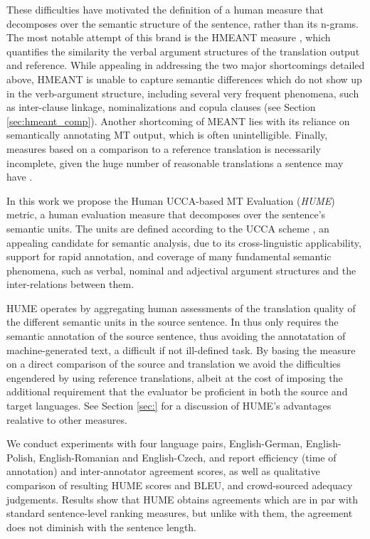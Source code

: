 \documentclass[11pt]{article}
\newcommand{\secref}[1]{Section \ref{#1}}
\begin{document}
These difficulties have motivated the definition of a human measure that decomposes over
the semantic structure of the sentence, rather than its n-grams. The most notable attempt of
this brand is the HMEANT
measure \cite{LoWu2010,lo2011structured,LoWu2011b,LoWu2012}, which quantifies the
similarity the verbal argument structures of the translation output and reference.
While appealing in addressing the two major shortcomings
detailed above, HMEANT is unable to capture semantic differences which do not show up in
the verb-argument structure, including several very frequent phenomena, such as
inter-clause linkage, nominalizations and copula clauses (see \secref{sec:hmeant_comp}).
Another shortcoming of MEANT lies with its reliance on semantically annotating MT output,
which is often unintelligible. Finally, measures based on a comparison to a reference translation
is necessarily incomplete, given the huge number of reasonable translations
a sentence may have \cite{dryer_marcu:12}.

In this work we propose the Human UCCA-based MT Evaluation ({\it HUME}) metric,
a human evaluation measure that decomposes over the sentence's semantic units.
The units are defined according to the 
UCCA scheme \cite{abend2013universal}, an appealing candidate for semantic analysis,
due to its cross-linguistic applicability, support for rapid annotation, and coverage
of many fundamental semantic phenomena, such as verbal, nominal and adjectival
argument structures and the inter-relations between them.

HUME operates by aggregating human assessments of the translation quality of the different
semantic units in the source sentence.
In thus only requires the semantic annotation of the source sentence, thus avoiding the 
annotatation of machine-generated text, a difficult if not ill-defined task.
By basing the measure on a direct comparison
of the source and translation we avoid the difficulties engendered by using
reference translations, albeit at the cost of imposing the additional requirement
that the evaluator be proficient in both the source and target languages.
See \secref{sec:} for a discussion of HUME's advantages realative to other measures.

We conduct experiments with four language pairs, English-German, English-Polish,
English-Romanian and English-Czech, and report efficiency (time of annotation) and
inter-annotator agreement scores, as well as qualitative comparison of resulting
HUME scores and BLEU, and crowd-sourced adequacy judgements. Results show that HUME obtains 
agreements which are in par with standard sentence-level ranking measures, but unlike with them,
the agreement does not diminish with the sentence length.
\end{document}
